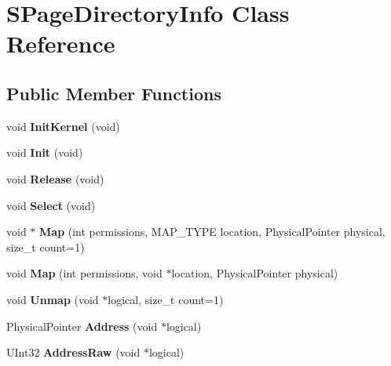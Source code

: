 \hypertarget{class_s_page_directory_info}{}\section{S\+Page\+Directory\+Info Class Reference}
\label{class_s_page_directory_info}
\subsection*{Public Member Functions}
\begin{DoxyCompactItemize}
\item 
\mbox{\label{class_s_page_directory_info_a3ada22a4f7887f4961d1a79071eaf793}} 
void {\bfseries Init\+Kernel} (void)
\item 
\mbox{\label{class_s_page_directory_info_a7b87d94738a15ae7788d8af5e452750f}} 
void {\bfseries Init} (void)
\item 
\mbox{\label{class_s_page_directory_info_a54f3f2db079b2d9ee0bd518290ab9d8d}} 
void {\bfseries Release} (void)
\item 
\mbox{\label{class_s_page_directory_info_ad661189fc7a0f3d2b43f7f83313f8af4}} 
void {\bfseries Select} (void)
\item 
\mbox{\label{class_s_page_directory_info_a5eda8091e4396d8cff5786a9f27f20f0}} 
void $\ast$ {\bfseries Map} (int permissions, M\+A\+P\+\_\+\+T\+Y\+PE location, Physical\+Pointer physical, size\+\_\+t count=1)
\item 
\mbox{\label{class_s_page_directory_info_acf749858027ebabfbc18c3c5894defb8}} 
void {\bfseries Map} (int permissions, void $\ast$location, Physical\+Pointer physical)
\item 
\mbox{\label{class_s_page_directory_info_ad9b8becd2da3b9ddf5614cc6331e8963}} 
void {\bfseries Unmap} (void $\ast$logical, size\+\_\+t count=1)
\item 
\mbox{\label{class_s_page_directory_info_a6cb762a909c71ea7cc29a10eeb49adfa}} 
Physical\+Pointer {\bfseries Address} (void $\ast$logical)
\item 
\mbox{\label{class_s_page_directory_info_a7c21fe1d15b803408a7d3c096400a87c}} 
U\+Int32 {\bfseries Address\+Raw} (void $\ast$logical)
\end{DoxyCompactItemize}
